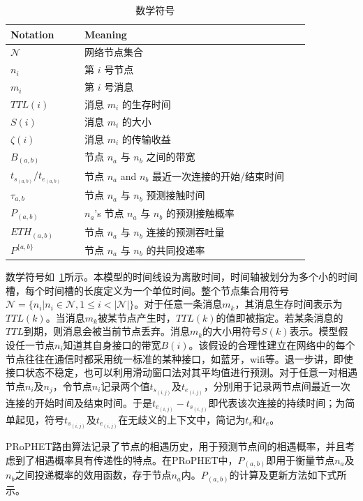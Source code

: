 \begin{table}
\centering
  \caption{数学符号}
    \label{tab:chap4_notations}
  \begin{tabular}{p{0.23\linewidth}<{\centering}p{0.7\linewidth}<{\centering}}
  \hline
    \textbf{Notation} & \textbf{Meaning}  \\
    \hline
   $\mathcal{N}$ & 网络节点集合 \\
   $n_i$ &  第 $i$ 号节点  \\
   $m_i$ &  第 $i$ 号消息 \\
   $TTL(i)$ & 消息 $m_i$ 的生存时间\\
   $S(i)$   & 消息 $m_i$ 的大小\\
    $\zeta(i)$ & 消息 $m_i$ 的传输收益\\
    $B_{(a,b)}$ & 节点 $n_a$ 与 $n_b$ 之间的带宽\\
   $t_{s_{(a,b)}}/t_{e_{(a,b)}}$   &  节点 $n_a$ and $n_b$ 最近一次连接的开始/结束时间\\
   $\tau_{a,b}$ & 节点 $n_a$ 与 $n_b$ 预测接触时间\\
  $P_{(a,b)}$ & $n_a$'s 节点 $n_a$ 与 $n_b$ 的预测接触概率 \\
  $ETH_{(a,b)}$ & 节点 $n_a$ 与 $n_b$ 连接的预测吞吐量\\
$P^{\{a,b\}}$ & 节点 $n_a$ 与 $n_b$ 的共同投递率\\
   \hline
  \end{tabular}
\end{table}

数学符号如\tablename~\ref{tab:chap4_notations}所示。本模型的时间线设为离散时间，时间轴被划分为多个小的时间槽，每个时间槽的长度定义为一个单位时间。整个节点集合用符号$\mathcal{N}=\{n_i|n_i\in\mathcal{N},1\leq i<|\mathcal{N}|\}$。对于任意一条消息$m_k$，其消息生存时间表示为$TTL(k)$。当消息$m_k$被某节点产生时，$TTL(k)$的值即被指定。若某条消息的$TTL$到期，则消息会被当前节点丢弃。消息$m_k$的大小用符号$S(k)$表示。模型假设任一节点$n_i$知道其自身接口的带宽$B(i)$。该假设的合理性建立在网络中的每个节点往往在通信时都采用统一标准的某种接口，如蓝牙，wifi等。退一步讲，即使接口状态不稳定，也可以利用滑动窗口法对其平均值进行预测。对于任意一对相遇节点$n_i$及$n_j$，令节点$n_i$记录两个值$t_{s_{(i,j)}}$及$t_{e_{(i,j)}}$，分别用于记录两节点间最近一次连接的开始时间及结束时间。于是$t_{e_{(i,j)}}-t_{s_{(i,j)}}$即代表该次连接的持续时间；为简单起见，符号$t_{s_{(i,j)}}$及$t_{e_{(i,j)}}$在无歧义的上下文中，简记为$t_s$和$t_e$。

PRoPHET路由算法\cite{AndersLindgren2004}记录了节点的相遇历史，用于预测节点间的相遇概率，并且考虑到了相遇概率具有传递性的特点。在PRoPHET中，$P_{(a,b)}$即用于衡量节点$n_a$及$n_b$之间投递概率的效用函数，存于节点$n_a$内。$P_{(a,b)}$的计算及更新方法如下式所示。


